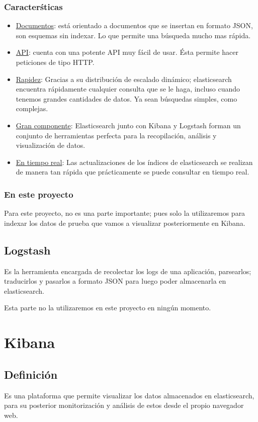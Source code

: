 \documentclass[a4paper, 12pt]{book}
\begin{document}
\subsubsection{Caracter\'sticas}
\begin{itemize}
\item \underline{Documentos}: est\'a orientado a documentos que se insertan en formato JSON, son esquemas sin indexar. Lo que permite una b\'usqueda mucho mas r\'apida.
\item \underline{API}: cuenta con una potente API muy f\'acil de usar. \'Esta permite hacer peticiones de tipo HTTP.
\item \underline{Rapidez}: Gracias a su distribuci\'on de escalado din\'amico; elasticsearch encuentra r\'apidamente cualquier consulta que se le haga, incluso cuando tenemos grandes cantidades de datos. Ya sean b\'usquedas simples, como complejas.
\item \underline{Gran componente}: Elasticsearch junto con Kibana y Logstash forman un conjunto de herramientas perfecta para la recopilaci\'on, an\'alisis y visualizaci\'on de datos.
\item \underline{En tiempo real}: Las actualizaciones de los \'indices de elasticsearch se realizan de manera tan r\'apida que pr\'acticamente se puede consultar en tiempo real.
\end{itemize}
\subsubsection{En este proyecto}
Para este proyecto, no es una parte importante; pues solo la utilizaremos para indexar los datos de prueba que vamos a visualizar posteriormente en Kibana.


\subsection{Logstash}
Es la herramienta encargada de recolectar los logs de una aplicaci\'on, parsearlos; traducirlos y pasarlos a formato JSON para luego poder almacenarla en elasticsearch. 

Esta parte no la utilizaremos en este proyecto en ningún momento.


\section{Kibana}
\label{sec:kibana}
\subsection{Definici\'on}
Es una plataforma que permite visualizar los datos almacenados en elasticsearch, para su posterior monitorizaci\'on y an\'alisis de estos desde el propio navegador web.
\end{document}
